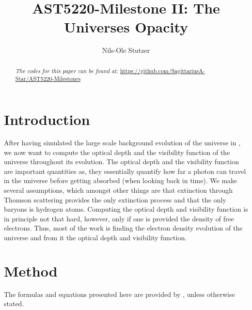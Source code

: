\documentclass[twocolumn]{aastex62}
\begin{document}
\title{\Large AST5220-Milestone II: The Universes Opacity}

\author{Nils-Ole Stutzer}

\begin{abstract}
    
    \textit{The codes for this paper can be found at:} \newline \url{https://github.com/SagittariusA-Star/AST5220-Milestones}
\end{abstract}

\section{Introduction} \label{sec:Intro}
After having simulated the large scale background evolution of the universe in \cite{stutzer:2020}, we now want to compute the optical depth and the visibility function of the universe throughout its evolution. The optical depth and the visibility function are important quantities as, they essentially quantify how far a photon can travel in the universe before getting absorbed (when looking back in time). We make several assumptions, which amongst other things are that extinction through Thomson scattering provides the only extinction process and that the only baryons is hydrogen atoms. Computing the optical depth and visibility function is in principle not that hard, however, only if one is provided the density of free electrons. Thus, most of the work is finding the electron density evolution of the universe and from it the optical depth and visibility function. 

\section{Method} \label{sec:Method}
The formulas and equations presented here are provided by \cite{winther:2020}, unless otherwise stated.
\end{document}
